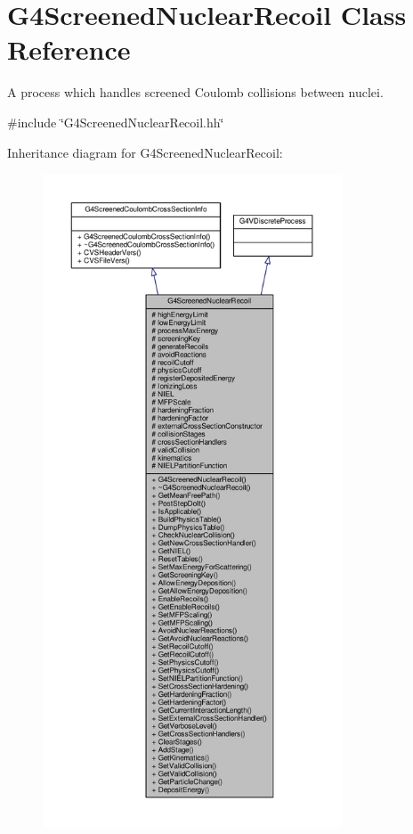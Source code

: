 \hypertarget{classG4ScreenedNuclearRecoil}{}\section{G4\+Screened\+Nuclear\+Recoil Class Reference}
\label{classG4ScreenedNuclearRecoil}


A process which handles screened Coulomb collisions between nuclei.  




{\ttfamily \#include \char`\"{}G4\+Screened\+Nuclear\+Recoil.\+hh\char`\"{}}



Inheritance diagram for G4\+Screened\+Nuclear\+Recoil\+:
\nopagebreak
\begin{figure}[H]
\begin{center}
\leavevmode
\includegraphics[height=550pt]{classG4ScreenedNuclearRecoil__inherit__graph}
\end{center}
\end{figure}


